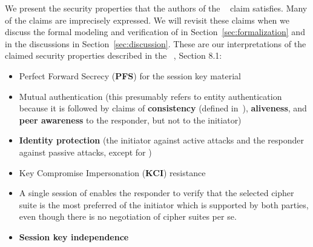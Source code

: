 We present the security properties that the authors
of the \mSpec{}~\cite{selander-lake-edhoc-01} claim \mEdhoc{} satisfies.
%
Many of the claims are imprecisely expressed.
%
We will revisit these claims when we discuss the formal modeling and
verification of \mEdhoc{} in Section~\ref{sec:formalization} and in the
discussions in Section~\ref{sec:discussion}.
%
These are our interpretations of the claimed security properties described in
the \mSpec~\cite{selander-lake-edhoc-01}, Section 8.1:
\begin{itemize}
    \item Perfect Forward Secrecy (\textbf{PFS}) for the session key material
    \item Mutual authentication (this presumably refers to entity authentication
        because it is followed by claims of
        \textbf{consistency} (defined in~\cite{sigma}),
        \textbf{aliveness}, and
        \textbf{peer awareness} to the responder, but not to the initiator)
    \item \textbf{Identity protection} (the initiator against active attacks
        and the responder against passive attacks, except for \mPskPsk{})
    \item Key Compromise Impersonation (\textbf{KCI}) resistance
    \item A single session of \mEdhoc{} enables the responder to verify
            that the selected cipher suite is the most preferred of the
            initiator which is supported by both parties, even though there is
            no negotiation of cipher suites per se.
    \item \textbf{Session key independence}
\end{itemize}

